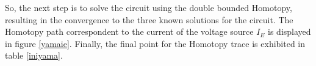 \documentclass[conference,letterpaper,onecolumn]{IEEEtran}
\begin{document}
{So, the next step is to solve the circuit using the double bounded Homotopy, resulting in the convergence to the three known solutions for the circuit. The Homotopy path correspondent to the current of the voltage source $I_E$ is displayed in figure \ref{yamaie}. Finally, the final point for the Homotopy trace is exhibited in table \ref{iniyama}.

\begin{table}[tbp]
{\small
{}
}
\caption{Solutions for the circuit with bipolar transistors and a diode.}
\label{yamamuracircuitosoluc}
\end{table}

}
\end{document}
